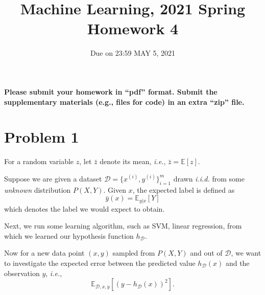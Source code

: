 \documentclass[10pt]{article}
\begin{document}
	
\title{Machine Learning, 2021 Spring\\Homework 4}
\date{Due on 23:59 MAY 5, 2021
	}
\maketitle




\textbf{Please submit your homework in ``pdf'' format. Submit the supplementary materials (e.g., files for code) in an {\color{red}extra} ``zip'' file.}

\section*{Problem 1} 
For a random variable $z$, let $\bar z$ denote its mean, \emph{i.e.}, $\bar{z}=\mathbb{E}[z]$. 

Suppose we are given a dataset $\mathcal{D}=\{x^{(i)},y^{(i)}\}_{i=1}^m$ drawn \emph{i.i.d.} from some \emph{unknown} distribution $P(X,Y)$. Given $x$, the expected label is defined as
\begin{equation}
    \bar{y}(x) = \mathbb{E}_{y|x}[Y]
\end{equation}
which denotes the label we would expect to obtain.

Next, we run some learning algorithm, such as SVM, linear regression, from which we learned our hypothesis function $h_{\mathcal{D}}$. 

Now for a new data point $(x,y)$ sampled from $P(X,Y)$ and out of $\mathcal{D}$, we want to investigate the expected error between the predicted value $h_{\mathcal{D}}(x)$ and the observation $y$, \emph{i.e.},
\begin{equation}
\mathbb{E}_{\mathcal{D},x,y}[(y-h_{\mathcal{D}}(x))^2].
\end{equation}
\end{document}
